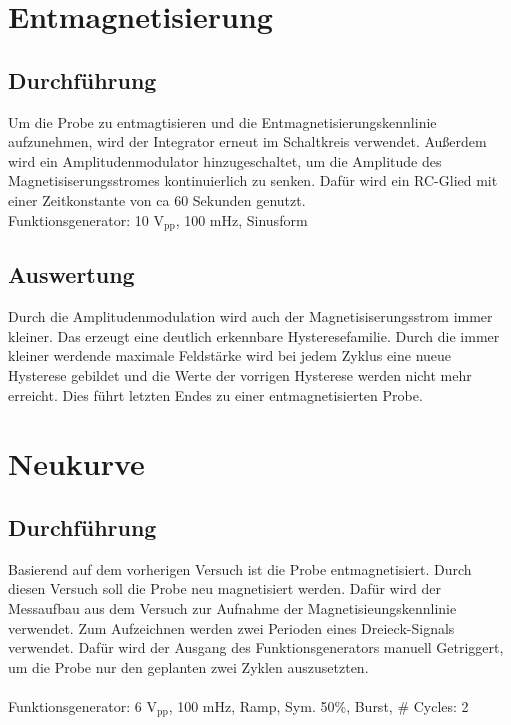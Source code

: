 \documentclass[a4paper,twoside,12pt,DIV=13,BCOR=5mm,numbers=noenddot,cleardoublepage=empty]{scrbook}
\begin{document}
    \section{Entmagnetisierung}
        \subsection{Durchf\"uhrung}
        Um die Probe zu entmagtisieren und die Entmagnetisierungskennlinie aufzunehmen, wird der Integrator erneut im Schaltkreis verwendet. Au\ss{}erdem wird ein Amplitudenmodulator hinzugeschaltet, um die Amplitude des Magnetisiserungsstromes kontinuierlich zu senken. Daf\"ur wird ein RC-Glied mit einer Zeitkonstante von ca 60 Sekunden genutzt.
        \\
        Funktionsgenerator: 10 V$_\mathrm{pp}$, 100 mHz, Sinusform
        \pagebreak
        \subsection{Auswertung}
        Durch die Amplitudenmodulation wird auch der Magnetisiserungsstrom immer kleiner. Das erzeugt eine deutlich erkennbare Hysteresefamilie. Durch die immer kleiner werdende maximale Feldst\"arke wird bei jedem Zyklus eine nueue Hysterese gebildet und die Werte der vorrigen Hysterese werden nicht mehr erreicht. Dies f\"uhrt letzten Endes zu einer entmagnetisierten Probe.
    \section{Neukurve}
        \subsection{Durchf\"uhrung}
        Basierend auf dem vorherigen Versuch ist die Probe entmagnetisiert. Durch diesen Versuch soll die Probe neu magnetisiert werden. Daf\"ur wird der Messaufbau aus dem Versuch zur Aufnahme der Magnetisieungskennlinie verwendet. Zum Aufzeichnen werden zwei Perioden eines Dreieck-Signals verwendet. Daf\"ur wird der Ausgang des Funktionsgenerators manuell Getriggert, um die Probe nur den geplanten zwei Zyklen auszusetzten.
        \\
        \\
        Funktionsgenerator:	6 V$_\mathrm{pp}$, 100 mHz, Ramp, Sym. 50\%, Burst, \# Cycles: 2
\end{document}
